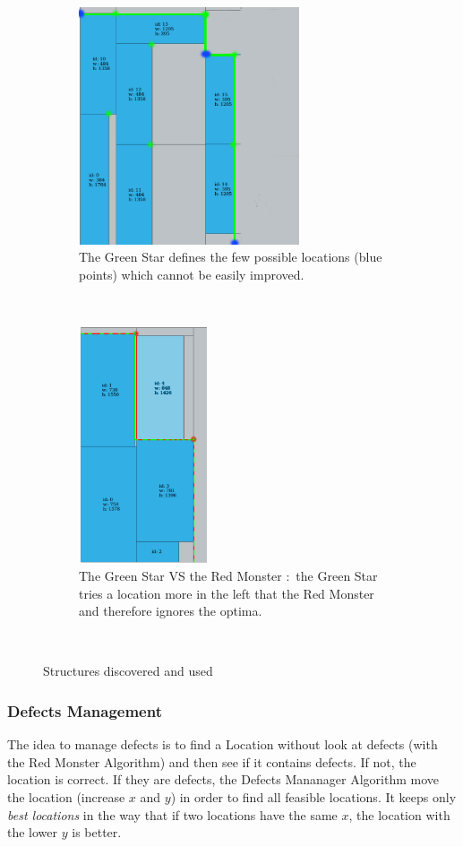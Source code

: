 \documentclass{article}
\begin{document}
\begin{figure}
    \centering
    \begin{subfigure}[b]{0.48\textwidth}
        \includegraphics[height=7cm]{greenStart.png}
        \caption{The Green Star defines the few possible locations (blue points) which cannot be easily improved.}
        \label{fig:gull}
    \end{subfigure}
    ~ %
    \begin{subfigure}[b]{0.48\textwidth}
        \centering
        \includegraphics[height=7cm]{greenvsred.png}
        \caption{The Green Star VS the Red Monster : the Green Star tries a location more in the left that the Red Monster and therefore ignores the optima.}
        \label{fig:tiger}
    \end{subfigure}
    ~ %
    \caption{Structures discovered and used}\label{fig:animals}
\end{figure}

        \subsubsection{Defects Management}
The idea to manage defects is to find a Location without look at defects (with the Red Monster Algorithm) and then see if it contains defects. If not, the location is correct. If they are defects, the Defects Mananager Algorithm move the location (increase $x$ and $y$) in order to find all feasible locations. It keeps only \textit{best locations} in the way that if two locations have the same $x$, the location with the lower $y$ is better.
\end{document}
